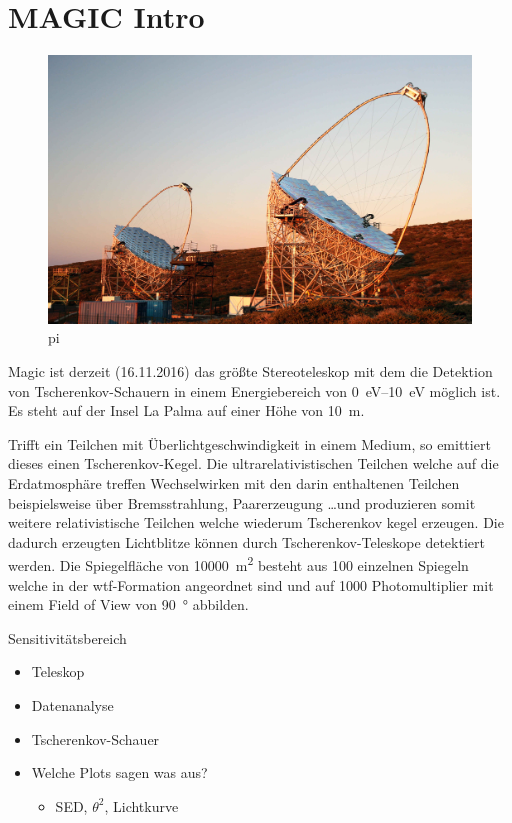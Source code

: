 \section{MAGIC Intro}%
\label{sec:magic}
\begin{figure}
		\includegraphics[width=\linewidth]{pictures/magic.JPG}
		\caption{pi}
		\label{fig:pi}
\end{figure}
Magic ist derzeit (16.11.2016) das größte Stereoteleskop mit dem die
Detektion von Tscherenkov-Schauern in einem Energiebereich von
\SIrange{0}{10}{\electronvolt} möglich ist.
Es steht auf der Insel La Palma auf einer Höhe von \SI{10}{\meter}.

Trifft ein Teilchen mit Überlichtgeschwindigkeit in einem Medium, so emittiert
dieses einen Tscherenkov-Kegel. 
Die ultrarelativistischen Teilchen welche auf die Erdatmosphäre treffen
Wechselwirken mit den darin enthaltenen Teilchen beispielsweise über
Bremsstrahlung, Paarerzeugung \ldots und produzieren somit weitere
relativistische Teilchen welche wiederum Tscherenkov kegel erzeugen.
Die dadurch erzeugten Lichtblitze können durch Tscherenkov-Teleskope detektiert
werden.
Die Spiegelfläche von \SI{10000}{\meter\squared} besteht aus \num{100} einzelnen
Spiegeln welche in der wtf-Formation angeordnet sind und auf \num{1000}
Photomultiplier mit einem Field of View von \SI{90}{\degree} abbilden. 


Sensitivitätsbereich

\begin{itemize}
  \item Teleskop
  \item Datenanalyse
\end{itemize}

\begin{itemize}
  \item Tscherenkov-Schauer
  \item Welche Plots sagen was aus?
    \begin{itemize}
      \item SED, $\theta^2$, Lichtkurve
    \end{itemize}
\end{itemize}

\clearpage
